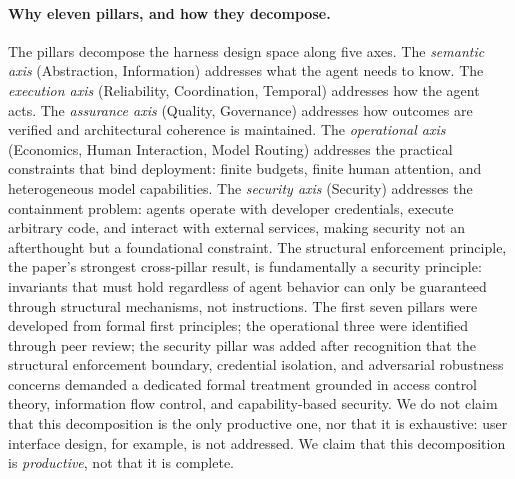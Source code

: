 \documentclass[11pt, a4paper]{googledeepmind}
\begin{document}
\paragraph{Why eleven pillars, and how they decompose.} The pillars decompose the harness design space along five axes. The \emph{semantic axis} (Abstraction, Information) addresses what the agent needs to know. The \emph{execution axis} (Reliability, Coordination, Temporal) addresses how the agent acts. The \emph{assurance axis} (Quality, Governance) addresses how outcomes are verified and architectural coherence is maintained. The \emph{operational axis} (Economics, Human Interaction, Model Routing) addresses the practical constraints that bind deployment: finite budgets, finite human attention, and heterogeneous model capabilities. The \emph{security axis} (Security) addresses the containment problem: agents operate with developer credentials, execute arbitrary code, and interact with external services, making security not an afterthought but a foundational constraint. The structural enforcement principle, the paper's strongest cross-pillar result, is fundamentally a security principle: invariants that must hold regardless of agent behavior can only be guaranteed through structural mechanisms, not instructions. The first seven pillars were developed from formal first principles; the operational three were identified through peer review; the security pillar was added after recognition that the structural enforcement boundary, credential isolation, and adversarial robustness concerns demanded a dedicated formal treatment grounded in access control theory, information flow control, and capability-based security. We do not claim that this decomposition is the only productive one, nor that it is exhaustive: user interface design, for example, is not addressed. We claim that this decomposition is \emph{productive}, not that it is complete.
\end{document}

